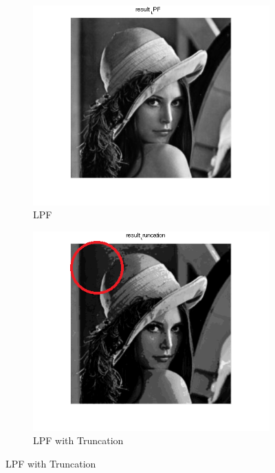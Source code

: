 \documentclass[12pt]{amsart}
\theoremstyle{definition}
\theoremstyle{remark}
\numberwithin{thm}{section}
\begin{document}
\begin{figure}[h] \centering 
\begin{subfigure}[b]{0.3\textwidth} \includegraphics[width=\textwidth]{LPF.png} \caption{LPF} \label{fig:LPF} \end{subfigure}
\begin{subfigure}[b]{0.3\textwidth} \includegraphics[width=\textwidth]{truncation.png} \caption{LPF with Truncation} \label{fig:LPF with Truncation} \end{subfigure}

\end{figure}
\end{document}
